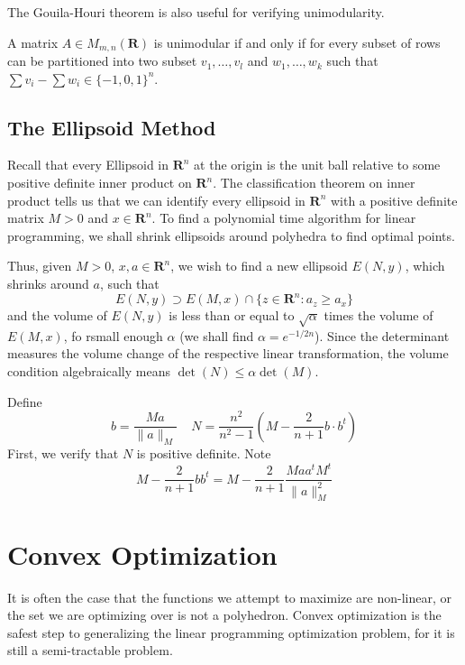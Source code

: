 The Gouila-Houri theorem is also useful for verifying unimodularity.

\begin{theorem}
    A matrix $A \in M_{m,n}(\mathbf{R})$ is unimodular if and only if for every subset of rows can be partitioned into two subset $v_1, \dots, v_l$ and $w_1, \dots, w_k$ such that $\sum v_i - \sum w_i \in \{ -1, 0, 1 \}^n$.
\end{theorem}

\chapter{The Ellipsoid Method}

Recall that every Ellipsoid in $\mathbf{R}^n$ at the origin is the unit ball relative to some positive definite inner product on $\mathbf{R}^n$. The classification theorem on inner product tells us that we can identify every ellipsoid in $\mathbf{R}^n$ with a positive definite matrix $M > 0$ and $x \in \mathbf{R}^n$. To find a polynomial time algorithm for linear programming, we shall shrink ellipsoids around polyhedra to find optimal points.

Thus, given $M > 0$, $x, a \in \mathbf{R}^n$, we wish to find a new ellipsoid $E(N,y)$, which shrinks around $a$, such that
%
\[ E(N, y) \supset E(M,x) \cap \{ z \in \mathbf{R}^n : a_z \geq a_x \} \]
%
and the volume of $E(N, y)$ is less than or equal to $\sqrt{\alpha}$ times the volume of $E(M,x)$, fo rsmall enough $\alpha$ (we shall find $\alpha = e^{-1/2n}$). Since the determinant measures the volume change of the respective linear transformation, the volume condition algebraically means $\det(N) \leq \alpha \det(M)$.

Define
%
\[ b = \frac{Ma}{\|a\|_M}\ \ \ \ \ N = \frac{n^2}{n^2 - 1} (M - \frac{2}{n+1} b \cdot b^t) \]
%
First, we verify that $N$ is positive definite. Note
%
\[ M - \frac{2}{n+1} bb^t = M - \frac{2}{n+1} \frac{Maa^tM^t}{\|a\|_M^2} \]



\part{Convex Optimization}

It is often the case that the functions we attempt to maximize are non-linear, or the set we are optimizing over is not a polyhedron. Convex optimization is the safest step to generalizing the linear programming optimization problem, for it is still a semi-tractable problem.

